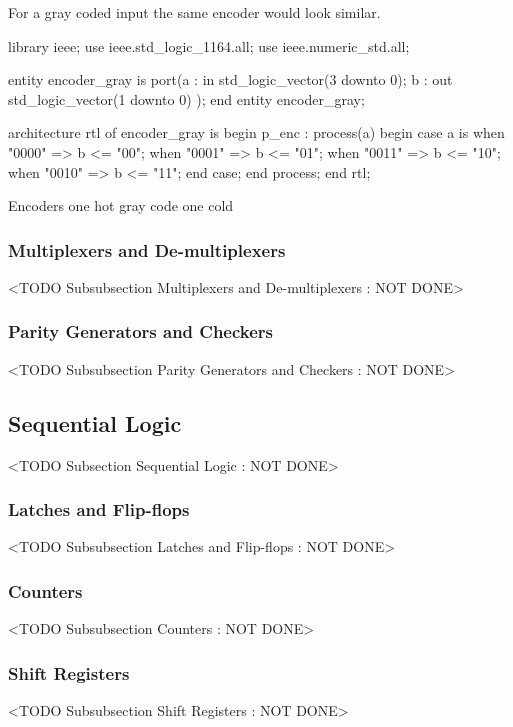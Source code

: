 For a gray coded input the same encoder would look similar.

\begin{VHDLlisting}[tabsize=8]
library ieee;
  use ieee.std_logic_1164.all;
  use ieee.numeric_std.all;
  
entity encoder_gray is
port(a : in    std_logic_vector(3 downto 0);
     b :   out std_logic_vector(1 downto 0)
);
end entity encoder_gray;

architecture rtl of encoder_gray is
begin
	p_enc : process(a)
	begin
		case a is	
			when "0000" => 
				b <= "00";
			when "0001" => 
				b <= "01";
			when "0011" => 
				b <= "10";
			when "0010" => 
				b <= "11";
		end case;
	end process;
end rtl;
\end{VHDLlisting}
	
	
	
Encoders
one hot
gray code
one cold

\subsubsection{Multiplexers and De-multiplexers}
	<TODO Subsubsection  Multiplexers and De-multiplexers : NOT DONE>

\subsubsection{Parity Generators and Checkers}
	<TODO Subsubsection  Parity Generators and Checkers : NOT DONE>

\subsection{Sequential Logic}
	<TODO Subsection Sequential Logic : NOT DONE>
	
\subsubsection{Latches and Flip-flops}
	<TODO Subsubsection  Latches and Flip-flops : NOT DONE>

\subsubsection{Counters}
	<TODO Subsubsection  Counters : NOT DONE>

\subsubsection{Shift Registers}
	<TODO Subsubsection  Shift Registers : NOT DONE>

